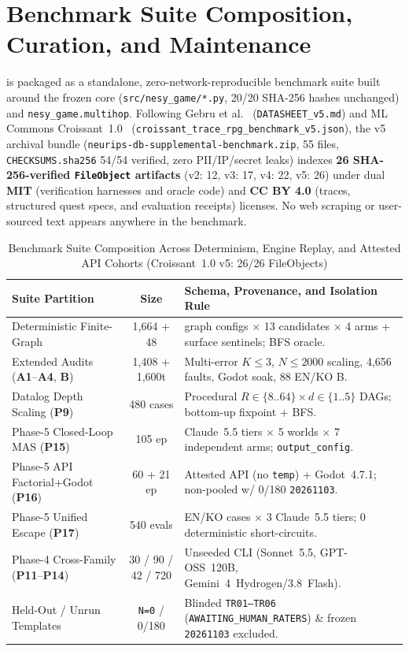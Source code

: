 \section{Benchmark Suite Composition, Curation, and Maintenance}\label{sec:db-composition}
\system{} is packaged as a standalone, zero-network-reproducible benchmark suite built around the frozen core (\texttt{src/nesy\_game/*.py}, 20/20 SHA-256 hashes unchanged) and \texttt{nesy\_game.multihop}. Following Gebru et al.~\cite{gebru2021datasheets} (\texttt{DATASHEET\_v5.md}) and ML Commons Croissant~1.0~\cite{akhtar2024croissant} (\texttt{croissant\_trace\_rpg\_benchmark\_v5.json}), the v5 archival bundle (\texttt{neurips-db-supplemental-benchmark.zip}, 55 files, \texttt{CHECKSUMS.sha256} 54/54 verified, zero PII/IP/secret leaks) indexes \textbf{26 SHA-256-verified \texttt{FileObject} artifacts} (v2: 12, v3: 17, v4: 22, v5: 26) under dual \textbf{MIT} (verification harnesses and oracle code) and \textbf{CC BY 4.0} (traces, structured quest specs, and evaluation receipts) licenses. No web scraping or user-sourced text appears anywhere in the benchmark.

\begin{table}[!tbp]
\caption{Benchmark Suite Composition Across Determinism, Engine Replay, and Attested API Cohorts (Croissant~1.0 v5: 26/26 FileObjects)}
\label{tab:phase5-db-comp}
\centering
\scriptsize
\setlength{\tabcolsep}{3pt}
\begin{tabularx}{\columnwidth}{@{}>{\raggedright\arraybackslash}p{}c>{\raggedright\arraybackslash}X@{}}
\toprule
\textbf{Suite Partition} & \textbf{Size} & \textbf{Schema, Provenance, and Isolation Rule} \\
\midrule
Deterministic Finite-Graph & 1,664 + 48 & 32 graph configs $\times$ 13 candidates $\times$ 4 arms + surface sentinels; BFS oracle. \\
Extended Audits (\textbf{A1}--\textbf{A4}, \textbf{B}) & 1,408 + 1,600t & Multi-error $K{\le}3$, $N{\le}2000$ scaling, 4,656 faults, Godot soak, 88 EN/KO B. \\
Datalog Depth Scaling (\textbf{P9}) & 480 cases & Procedural $R{\in}\{8..64\}\times d{\in}\{1..5\}$ DAGs; bottom-up fixpoint + BFS. \\
Phase-5 Closed-Loop MAS (\textbf{P15}) & 105 ep & 3 Claude~5.5 tiers $\times$ 5 worlds $\times$ 7 independent arms; \texttt{output\_config}. \\
Phase-5 API Factorial+Godot (\textbf{P16}) & 60 + 21 ep & Attested API (no \texttt{temp}) + Godot~4.7.1; non-pooled w/ 0/180 \texttt{20261103}. \\
Phase-5 Unified Escape (\textbf{P17}) & 540 evals & 180 EN/KO cases $\times$ 3 Claude~5.5 tiers; 0 deterministic short-circuits. \\
Phase-4 Cross-Family (\textbf{P11}--\textbf{P14}) & 30 / 90 / 42 / 720 & Unseeded CLI (Sonnet~5.5, GPT-OSS~120B, Gemini~4~Hydrogen/3.8~Flash). \\
Held-Out / Unrun Templates & \texttt{N=0} / 0/180 & Blinded \texttt{TR01--TR06} (\texttt{AWAITING\_HUMAN\_RATERS}) \& frozen \texttt{20261103} excluded. \\
\bottomrule
\end{tabularx}
\end{table}

